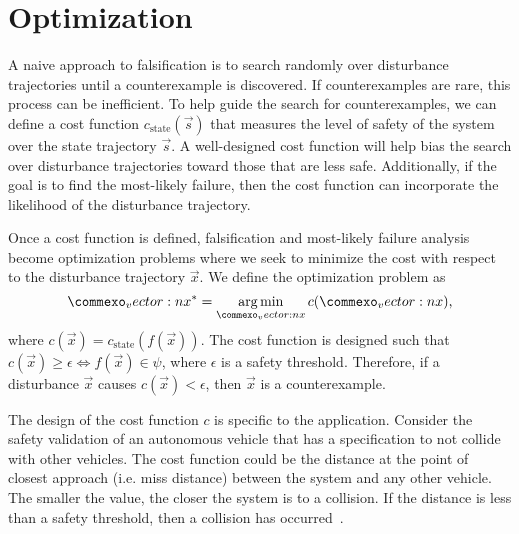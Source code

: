 \section{Optimization}
A naive approach to falsification is to search randomly over disturbance trajectories until a counterexample is discovered. If counterexamples are rare, this process can be inefficient. To help guide the search for counterexamples, we can define a cost function $c_{\text{state}}(\vec{s})$ that measures the level of safety of the system over the state trajectory $\vec{s}$. A well-designed cost function will help bias the search over disturbance trajectories toward those that are less safe. Additionally, if the goal is to find the most-likely failure, then the cost function can incorporate the likelihood of the disturbance trajectory. 

Once a cost function is defined, falsification and most-likely failure analysis become optimization problems where we seek to minimize the cost with respect to the disturbance trajectory $\vec{x}$. We define the optimization problem as
\begin{equation}
    \vec{x}^* = \argmin_{\vec{x}} c(\vec{x}) \text{,}
\end{equation}
where $c(\vec{x}) = c_{\text{state}}(f(\vec{x}))$. The cost function is designed such that $c(\vec{x}) \geq \epsilon \iff f(\vec{x}) \in \psi$, where $\epsilon$ is a safety threshold. Therefore, if a disturbance $\vec{x}$ causes $c(\vec{x}) < \epsilon$, then $\vec{x}$ is a counterexample. 

The design of the cost function $c$ is specific to the application. Consider the safety validation of an autonomous vehicle that has a specification to not collide with other vehicles. The cost function could be the distance at the point of closest approach (i.e. miss distance) between the system and any other vehicle. The smaller the value, the closer the system is to a collision. If the distance is less than a safety threshold, then a collision has occurred~\cite{koren2018adaptive}.

